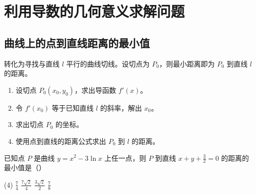\section{利用导数的几何意义求解问题}

\subsection{曲线上的点到直线距离的最小值}
\begin{theorem}[曲线到直线距离的最小值]
    转化为寻找与直线 $l$ 平行的曲线切线。设切点为 $P_0$，则最小距离即为 $P_0$ 到直线 $l$ 的距离。
    \begin{enumerate}
        \item 设切点 $P_0(x_0, y_0)$，求出导函数 $f'(x)$。
        \item 令 $f'(x_0)$ 等于已知直线 $l$ 的斜率，解出 $x_0$。
        \item 求出切点 $P_0$ 的坐标。
        \item 使用点到直线的距离公式求出 $P_0$ 到 $l$ 的距离。
    \end{enumerate}
\end{theorem}
\begin{example}
    已知点 $P$ 是曲线 $y = x^{2} - 3\ln x$ 上任一点，则 $P$ 到直线 $x + y + \frac{3}{2} = 0$ 的距离的最小值是（\quad）
    \begin{tasks}(4)
        \task $\frac{7}{4}$ \task $\frac{7\sqrt{2}}{4}$ \task $\frac{3\sqrt{2}}{2}$
        \task $\frac{7}{8}$
    \end{tasks}
\end{example}

\vspace{4em}